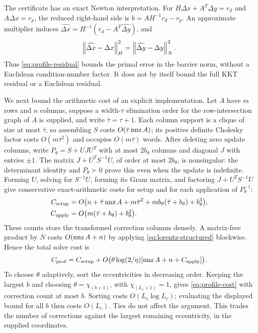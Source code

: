 The certificate has an exact Newton interpretation. For
$H\Delta x+A^T\Delta y=r_d$ and $A\Delta x=r_p$, the reduced right-hand
side is $b=AH^{-1}r_d-r_p$. An approximate multiplier induces
$\widehat{\Delta x}=H^{-1}(r_d-A^T\widehat{\Delta y})$, and
\begin{equation}\label{eq:primal-energy}
 \left\lVert\widehat{\Delta x}-\Delta x\right\rVert_H^2
       =\left\lVert\widehat{\Delta y}-\Delta y\right\rVert_N^2.
\end{equation}
Thus \eqref{eq:profile-residual} bounds the primal error in the barrier
norm, without a Euclidean condition-number factor. It does not by itself
bound the full KKT residual or a Euclidean residual.

We next bound the arithmetic cost of an explicit implementation. Let $A$
have $m$ rows and $n$ columns, suppose a width-$\tau$ elimination order
for the row-intersection graph of $A$ is supplied, and write
$\bar\tau=\tau+1$. Each column support
is a clique of size at most $\bar\tau$, so assembling $S$ costs
$O(\bar\tau\operatorname{nnz} A)$; its positive definite Cholesky factor costs
$O(m\bar\tau^2)$ and occupies $O(m\bar\tau)$ words. After deleting
zero update columns, write $P_\theta=S+UJU^T$ with at most $2b_\theta$
columns and diagonal $J$ with entries $\pm1$. The matrix
$J+U^TS^{-1}U$, of order at most $2b_\theta$, is nonsingular: the
determinant identity and $P_\theta\succ0$ prove this even when the update
is indefinite. Forming $U$, solving for $S^{-1}U$, forming its Gram
matrix, and factoring $J+U^TS^{-1}U$ give conservative exact-arithmetic
costs for setup and for each application of $P_\theta^{-1}$:
\begin{align}
 C_{\rm setup}&=O\bigl(n+\bar\tau\operatorname{nnz} A+m\bar\tau^2
                  +mb_\theta(\bar\tau+b_\theta)+b_\theta^3\bigr),
                  \label{eq:profile-setup}\\
 C_{\rm apply}&=O\bigl(m(\bar\tau+b_\theta)+b_\theta^2\bigr).
                  \label{eq:profile-apply}
\end{align}
These counts store the transformed correction columns densely.
A matrix-free product by $N$ costs $O(\operatorname{nnz} A+n)$ by applying
\eqref{eq:lorentz-structured} blockwise. Hence the total solve cost is
\begin{equation}\label{eq:profile-cost}
 C_{\rm prof}=C_{\rm setup}
     +O\bigl(\theta\log(2/\eta)[\operatorname{nnz} A+n+C_{\rm apply}]\bigr).
\end{equation}
To choose $\theta$ adaptively, sort the eccentricities in decreasing order.
Keeping the largest $b$ and choosing $\theta=\chi_{(b+1)}$, with
$\chi_{(L_c+1)}=1$, gives \eqref{eq:profile-cost} with correction count
at most $b$. Sorting costs $O(L_c\log L_c)$; evaluating the displayed
bound for all $b$ then costs $O(L_c)$. Ties do not affect the argument.
This trades the number of corrections against the largest remaining
eccentricity, in the supplied coordinates.

